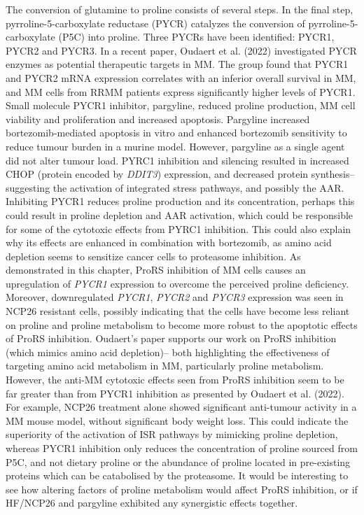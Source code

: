 The conversion of glutamine to proline consists of several steps.
In the final step, pyrroline-5-carboxylate reductase (PYCR) catalyzes the conversion of pyrroline-5-carboxylate (P5C) into proline.
Three PYCRs have been identified: PYCR1, PYCR2 and PYCR3.
In a recent paper, Oudaert et al. (2022) investigated PYCR enzymes as potential therapeutic targets in MM\cite{oudaert2022pyrroline}.
The group found that PYCR1 and PYCR2 mRNA expression correlates with an inferior overall survival in MM, and MM cells from RRMM patients express significantly higher levels of PYCR1\@.
Small molecule PYCR1 inhibitor, pargyline, reduced proline production, MM cell viability and proliferation and increased apoptosis.
Pargyline increased bortezomib-mediated apoptosis in vitro and enhanced bortezomib sensitivity to reduce tumour burden in a murine model.
However, pargyline as a single agent did not alter tumour load.
PYRC1 inhibition and silencing resulted in increased CHOP (protein encoded by \textit{DDIT3}) expression, and decreased protein synthesis-- suggesting the activation of integrated stress pathways, and possibly the AAR.
Inhibiting PYCR1 reduces proline production and its concentration, perhaps this could result in proline depletion and AAR activation, which could be responsible for some of the cytotoxic effects from PYRC1 inhibition.
This could also explain why its effects are enhanced in combination with bortezomib, as amino acid depletion seems to sensitize cancer cells to proteasome inhibition\cite{mizrachy2010amino}.
As demonstrated in this chapter, ProRS inhibition of MM cells causes an upregulation of \textit{PYCR1} expression to overcome the perceived proline deficiency.
Moreover, downregulated \textit{PYCR1}, \textit{PYCR2} and \textit{PYCR3} expression was seen in NCP26 resistant cells, possibly indicating that the cells have become less reliant on proline and proline metabolism to become more robust to the apoptotic effects of ProRS inhibition.
Oudaert's paper supports our work on ProRS inhibition (which mimics amino acid depletion)-- both highlighting the effectiveness of targeting amino acid metabolism in MM, particularly proline metabolism.
However, the anti-MM cytotoxic effects seen from ProRS inhibition seem to be far greater than from PYCR1 inhibition as presented by Oudaert et al. (2022).
For example, NCP26 treatment alone showed significant anti-tumour activity in a MM mouse model, without significant body weight loss\cite{bottpreclinical2022}.
This could indicate the superiority of the activation of ISR pathways by mimicking proline depletion, whereas PYCR1 inhibition only reduces the concentration of proline sourced from P5C, and not dietary proline or the abundance of proline located in pre-existing proteins which can be catabolised by the proteasome.
It would be interesting to see how altering factors of proline metabolism would affect ProRS inhibition, or if HF/NCP26 and pargyline exhibited any synergistic effects together.

